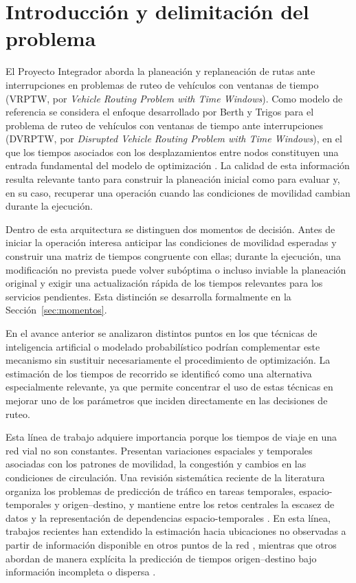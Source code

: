 \documentclass[11pt]{article}
\begin{document}
\tableofcontents
\newpage

\section{Introducción y delimitación del problema}

El Proyecto Integrador aborda la planeación y replaneación de rutas ante
interrupciones en problemas de ruteo de vehículos con ventanas de tiempo
(VRPTW, por \textit{Vehicle Routing Problem with Time Windows}). Como modelo
de referencia se considera el enfoque desarrollado por Berth y Trigos para el
problema de ruteo de vehículos con ventanas de tiempo ante interrupciones
(DVRPTW, por \textit{Disrupted Vehicle Routing Problem with Time Windows}), en
el que los tiempos asociados con los desplazamientos entre nodos constituyen
una entrada fundamental del modelo de optimización
\citep{berth_trigos_2025,berth_thesis_2025}. La calidad de esta información
resulta relevante tanto para construir la planeación inicial como para evaluar
y, en su caso, recuperar una operación cuando las condiciones de movilidad
cambian durante la ejecución.

Dentro de esta arquitectura se distinguen dos momentos de decisión. Antes de
iniciar la operación interesa anticipar las condiciones de movilidad esperadas
y construir una matriz de tiempos congruente con ellas; durante la ejecución,
una modificación no prevista puede volver subóptima o incluso inviable la
planeación original y exigir una actualización rápida de los tiempos relevantes
para los servicios pendientes. Esta distinción se desarrolla formalmente en la
Sección~\ref{sec:momentos}.

En el avance anterior se analizaron distintos puntos en los que técnicas de
inteligencia artificial o modelado probabilístico podrían complementar este
mecanismo sin sustituir necesariamente el procedimiento de optimización. La
estimación de los tiempos de recorrido se identificó como una alternativa
especialmente relevante, ya que permite concentrar el uso de estas técnicas en
mejorar uno de los parámetros que inciden directamente en las decisiones de
ruteo.

Esta línea de trabajo adquiere importancia porque los tiempos de viaje en una
red vial no son constantes. Presentan variaciones espaciales y temporales
asociadas con los patrones de movilidad, la congestión y cambios en las
condiciones de circulación. Una revisión sistemática reciente de la literatura
organiza los problemas de predicción de tráfico en tareas temporales,
espacio-temporales y origen--destino, y mantiene entre los retos centrales la
escasez de datos y la representación de dependencias espacio-temporales
\citep{du2025survey}. En esta línea, trabajos recientes han extendido la
estimación hacia ubicaciones no observadas a partir de información disponible
en otros puntos de la red \citep{lei2024conditional,zhou2025mogernn},
mientras que otros abordan de manera explícita la predicción de tiempos
origen--destino bajo información incompleta o dispersa
\citep{wang2025od}.
\end{document}
